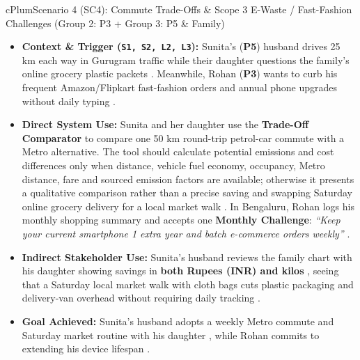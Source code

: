 \documentclass[12pt, a4paper]{article}
\begin{document}
\begin{scenariocard}{cPlum}{Scenario 4 (SC4): Commute Trade-Offs \& Scope 3 E-Waste / Fast-Fashion Challenges (Group 2: P3 + Group 3: P5 \& Family)}
\footnotesize
\begin{itemize}
    \item \textbf{Context \& Trigger (\texttt{S1, S2, L2, L3}):} Sunita's (\textbf{P5}) husband drives 25 km each way in Gurugram traffic while their daughter questions the family's online grocery plastic packets \cite{cf6}. Meanwhile, Rohan (\textbf{P3}) wants to curb his frequent Amazon/Flipkart fast-fashion orders and annual phone upgrades without daily typing \cite{cf2, cf10}.
    \item \textbf{Direct System Use:} Sunita and her daughter use the \textbf{Trade-Off Comparator} to compare one 50 km round-trip petrol-car commute with a Metro alternative. The tool should calculate potential emissions and cost differences only when distance, vehicle fuel economy, occupancy, Metro distance, fare and sourced emission factors are available; otherwise it presents a qualitative comparison rather than a precise saving and swapping Saturday online grocery delivery for a local market walk \cite{cf5, cf6}. In Bengaluru, Rohan logs his monthly shopping summary and accepts one \textbf{Monthly Challenge}: \textit{``Keep your current smartphone 1 extra year and batch e-commerce orders weekly''} \cite{koide2019, cf2, cf10}.
    \item \textbf{Indirect Stakeholder Use:} Sunita's husband reviews the family chart with his daughter showing savings in \textbf{both Rupees (INR) and kilos} \cite{cf6}, seeing that a Saturday local market walk with cloth bags cuts plastic packaging and delivery-van overhead without requiring daily tracking \cite{cf5, cf6}.
    \item \textbf{Goal Achieved:} Sunita's husband adopts a weekly Metro commute and Saturday market routine with his daughter \cite{cf5, cf6}, while Rohan commits to extending his device lifespan \cite{cf10}.
\end{itemize}
\end{scenariocard}
\end{document}
